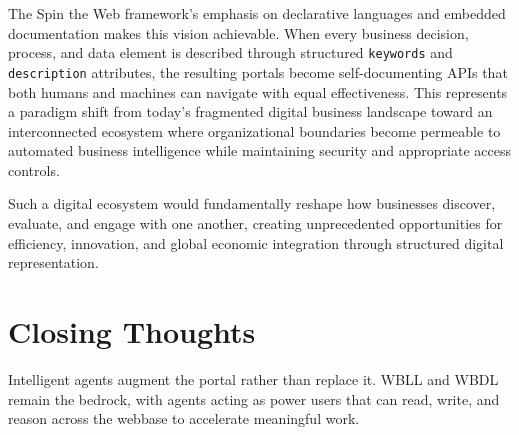 The Spin the Web framework's emphasis on declarative languages and embedded documentation makes this vision achievable. When every business decision, process, and data element is described through structured \texttt{keywords} and \texttt{description} attributes, the resulting portals become self-documenting APIs that both humans and machines can navigate with equal effectiveness. This represents a paradigm shift from today's fragmented digital business landscape toward an interconnected ecosystem where organizational boundaries become permeable to automated business intelligence while maintaining security and appropriate access controls.

Such a digital ecosystem would fundamentally reshape how businesses discover, evaluate, and engage with one another, creating unprecedented opportunities for efficiency, innovation, and global economic integration through structured digital representation.

\section{Closing Thoughts}
Intelligent agents augment the portal rather than replace it. WBLL and WBDL remain the bedrock, with agents acting as power users that can read, write, and reason across the webbase to accelerate meaningful work.
